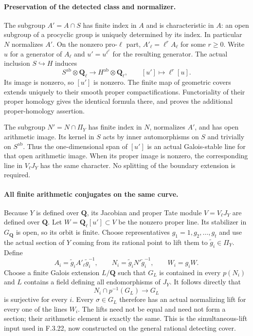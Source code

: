 \paragraph{Preservation of the detected class and normalizer.}
The subgroup $A'=A\cap S$ has finite index in $A$ and is
characteristic in $A$: an open subgroup of a procyclic group
is uniquely determined by its index. In particular $N$
normalizes $A'$. On the nonzero pro-$\ell$ part,
$A'_\ell=\ell^r A_\ell$ for some $r\geq0$. Write $u$ for
a generator of $A_\ell$ and $u'=u^{\ell^r}$ for the resulting
generator. The actual inclusion $S\hookrightarrow H$ induces
\[
 S^{\mathrm{ab}}\otimes\mathbf Q_\ell
 \longrightarrow H^{\mathrm{ab}}\otimes\mathbf Q_\ell,
 \qquad [u']\longmapsto\ell^r[u].
\]
Its image is nonzero, so $[u']$ is nonzero. The finite map of
geometric covers extends uniquely to their smooth proper
compactifications. Functoriality of their proper homology
gives the identical formula there, and proves the additional
proper-homology assertion.

The subgroup $N'=N\cap\Pi_Y$ has finite index in $N$,
normalizes $A'$, and has open arithmetic image. Its kernel
in $S$ acts by inner automorphisms on $S$ and trivially on
$S^{\mathrm{ab}}$. Thus the one-dimensional span of $[u']$
is an actual Galois-stable line for that open arithmetic
image. When its proper image is nonzero, the corresponding
line in $V_\ell J_Y$ has the same character. No splitting of
the boundary extension is required.

\paragraph{All finite arithmetic conjugates on the same curve.}
Because $Y$ is defined over $\mathbf Q$, its Jacobian and
proper Tate module $V=V_\ell J_Y$ are defined over
$\mathbf Q$. Let $W=\mathbf Q_\ell[u']\subset V$ be the
nonzero proper line. Its stabilizer in $G_{\mathbf Q}$ is
open, so its orbit is finite. Choose representatives
$g_1=1,g_2,\ldots,g_t$ and use the actual section of $Y$
coming from its rational point to lift them to
$\widetilde g_i\in\Pi_Y$. Define
\[
 A_i=\widetilde g_i A'_\ell\widetilde g_i^{-1},\qquad
 N_i=\widetilde g_i N'\widetilde g_i^{-1},\qquad
 W_i=g_iW.
\]
Choose a finite Galois extension $L/\mathbf Q$ such that
$G_L$ is contained in every $p(N_i)$ and $L$ contains a
field defining all endomorphisms of $J_Y$.
It follows directly that
\[
 N_i\cap p^{-1}(G_L)\longrightarrow G_L
\]
is surjective for every $i$. Every $\sigma\in G_L$ therefore
has an actual normalizing lift for every one of the lines
$W_i$. The lifts need not be equal and need not form a
section; their arithmetic element is exactly the same.
This is the simultaneous-lift input used in F.3.22, now
constructed on the general rational detecting cover.

